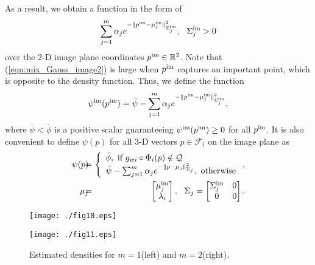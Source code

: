\documentclass[conference,letterpaper]{ieeeconf}
\newcommand{\Q}{{\mathcal Q}}
\newcommand{\F}{{\mathcal F}}
\newcommand{\R}{{\mathbb R}}
\begin{document}
As a result, we obtain a function in the form of
\begin{equation}
\sum_{j=1}^m \alpha_j e^{-\|p^{\rm im} - \mu^{\rm im}_j\|^2_{\Sigma_j^{\rm im}}},\ \
\Sigma_j^{\rm im} > 0
\label{eqn:mix_Gauss_image2}
\end{equation} 
over the 2-D image plane coordinates $p^{\rm im} \in \R^2$.
Note that (\ref{eqn:mix_Gauss_image2}) is large when
$p^{\rm im}$ captures an important point, which is opposite to 
the density function.
Thus, we define the function
\begin{equation}
\psi^{\rm im}(p^{\rm im}) = \bar{\psi} -
\sum_{j=1}^m \alpha_j e^{-\|p^{\rm im} - \mu^{\rm im}_j\|^2_{\Sigma_j^{\rm im}}},
\label{eqn:mix_Gauss_image}
\end{equation} 
where $\bar{\psi} < \bar{\phi}$ is a positive scalar guaranteeing $\psi^{\rm im}(p^{\rm im}) \geq 0$
for all $p^{\rm im}$.
It is also convenient to
define $\psi(p)$ for all
3-D vectors $p\in \F_i$ on the image plane as
\begin{eqnarray}
\psi (p) \!\!&\!\!=\!\!&\!\!
\left\{
\begin{array}{l}
\bar{\phi},\ \mbox{if }g_{wi} \circ \Phi_i(p) \notin \Q \\
\bar{\psi} - \sum_{j=1}^m \alpha_j 
e^{-\|p - \mu_j\|^2_{\Sigma_j}},\ 
\mbox{otherwise}
\end{array}
\right.,
\label{eqn:mix_Gauss}\\
\mu_j \!\!&\!\!=\!\!&\!\! 
\begin{bmatrix}
\mu^{\rm im}_j\\
\lambda_i
\end{bmatrix},\ \
\Sigma_j =
\begin{bmatrix}
\Sigma_j^{\rm im}&0\\
0&0
\end{bmatrix}.
\end{eqnarray} 







\begin{figure}
\begin{center}
\begin{minipage}{4cm}
{\texttt{[image: ./fig10.eps]}}
\end{minipage}
\hspace{0.2cm}
\begin{minipage}{4cm}
{\texttt{[image: ./fig11.eps]}}
\end{minipage}
\caption{Estimated densities for $m = 1$(left) and $m = 2$(right).}
\label{fig:mix_gauss_various}
\end{center}
\end{figure}
\end{document}
